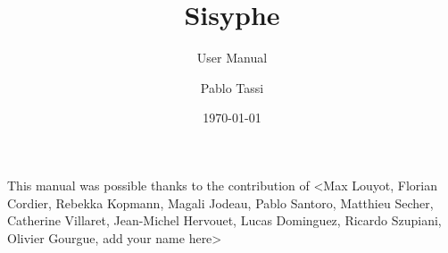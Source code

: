 \documentclass[Sisyphe]{../../data/TelemacDoc} %
\begin{document}
\let\cleardoublepage\clearpage

\setlength\parindent{0pt}

\title{Sisyphe}
\subtitle{User Manual}
\author{Pablo Tassi}
\date{\today}
\maketitle
\clearpage



\newpage

\thispagestyle{empty}

\TelemacCopyright{}




\pagestyle{empty} %

\tableofcontents%


\pagestyle{fancy} %

\pagebreak
This manual was possible thanks to the contribution of <Max Louyot, Florian Cordier, Rebekka Kopmann, Magali Jodeau, Pablo Santoro, Matthieu Secher, Catherine Villaret, Jean-Michel Hervouet, Lucas Dominguez, Ricardo Szupiani, Olivier Gourgue, add your name here>
\pagebreak



\end{document}
